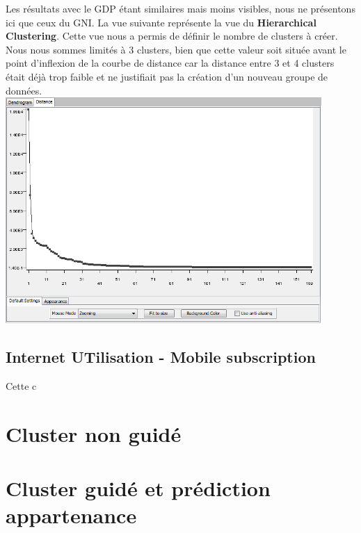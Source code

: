 		Les résultats avec le GDP étant similaires mais moins visibles, nous ne présentons ici que ceux du GNI.
		La vue suivante représente la vue du \textbf{Hierarchical Clustering}. Cette vue nous a permis de définir le nombre de clusters à créer. Nous nous sommes limités à 3 clusters, bien que cette valeur soit située avant le point d'inflexion de la courbe de distance car la distance entre 3 et 4 clusters était déjà trop faible et ne justifiait pas la création d'un nouveau groupe de données.\\
		\includegraphics[width=0.9\textwidth]{distanceGNI.png}\\

    \subsection{Internet UTilisation - Mobile subscription}
        Cette c


\section{Cluster non guidé}

\section{Cluster guidé et prédiction appartenance}
